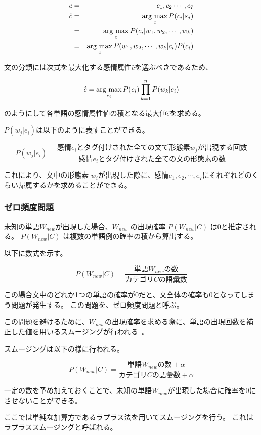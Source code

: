 \documentclass[11pt,a4j]{jsarticle}
\newcommand{\argmax}{\mathop{\rm arg~max}\limits}
\begin{document}
\begin{eqnarray*}
c & = & {c_1,c_2 \cdots ,c_7}\\
\hat{c} & = & \argmax_{c} P(c_i|s_j) \\
        & = & \argmax_{c} P(c_i|w_1,w_2,\cdots ,w_k) \\
        & = & \argmax_{c} P(w_1,w_2,\cdots ,w_k|c_i)P(c_i) \\
\end{eqnarray*}

文の分類には次式を最大化する感情属性$\hat{c}$を選ぶべきであるため、

\[
\hat{c}=\argmax_{c_i} P(c_i)\prod_{k=1}^n P(w_k|c_i)
\]

のようにして各単語の感情属性値の積となる最大値$\hat{e}$を求める。

$P(w_j|e_i)$は以下のように表すことができる。

\[
P(w_j|e_i)=\frac{感情 e_i とタグ付けされた全ての文で形態素 w_j が出現する回数}{感情 e_i とタグ付けされた全ての文の形態素の数}
\]

これにより、文中の形態素 $w_i$が出現した際に、感情$e_1,e_2, \cdots ,e_7$にそれぞれどのくらい帰属するかを求めることができる。

\subsubsection{ゼロ頻度問題}\label{sec:zero}
未知の単語$W_\mathit{new}$が出現した場合、$W_\mathit{new}$ の出現確率 $P(W_\mathit{new}|C)$ は0と推定される。
$P(W_\mathit{new}|C)$ は複数の単語例の確率の積から算出する。

以下に数式を示す。

\[
P(W_\mathit{new}|C)=\frac{単語 W_\mathit{new} の数}{カテゴリC の語彙数}
\]

この場合文中のどれか1つの単語の確率が0だと、文全体の確率も0となってしまう問題が発生する。
この問題を、ゼロ頻度問題と呼ぶ。

この問題を避けるために、$W_\mathit{new}$の出現確率を求める際に、単語の出現回数を補正した値を用いるスムージングが行われる~。

スムージングは以下の様に行われる。

\[
P(W_\mathit{new}|C)=\frac{単語 W_\mathit{new} の数 + \alpha }{カテゴリC の語彙数 + \alpha }
\]

一定の数を予め加えておくことで、未知の単語$W_\mathit{new}$が出現した場合に確率を0にさせないことができる。

ここでは単純な加算方であるラプラス法を用いてスムージングを行う。
これはラプラススムージングと呼ばれる。
\end{document}
